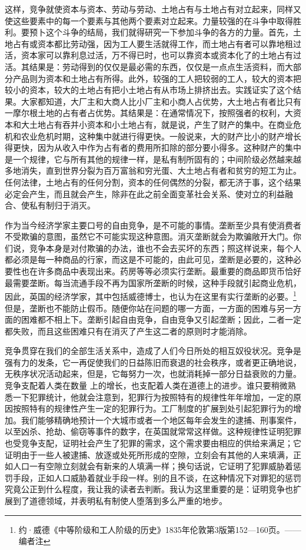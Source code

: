 \documentclass[a4paper,twoside,12pt]{ctexart}
\begin{document}
这样，竞争就使资本与资本、劳动与劳动、土地占有与土地占有对立起来，同样又使这些要素中的每一个要素与其他两个要素对立起来。力量较强的在斗争中取得胜利。要预卜这个斗争的结局，我们就得研究一下参加斗争的各方的力量。首先，土地占有或资本都比劳动强，因为工人要生活就得工作，而土地占有者可以靠地租过活，资本家可以靠利息过活，万不得已时，也可以靠资本或资本化了的土地占有过活。其结果是：劳动得到的仅仅是最必需的东西，仅仅是一点点生活资料，而大部分产品则为资本和土地占有所得。此外，较强的工人把较弱的工人，较大的资本把较小的资本，较大的土地占有把小土地占有从市场上排挤出去。实践证实了这个结果。大家都知道，大厂主和大商人比小厂主和小商人占优势，大土地占有者比只有一摩尔根土地的占有者占优势。其结果是：在通常情况下，按照强者的权利，大资本和大土地占有吞并小资本和小土地占有，就是说，产生了财产的集中。在商业危机和农业危机时期，这种集中就进行得更快。一般说来，大的财产比小的财产增长得更快，因为从收入中作为占有者的费用所扣除的部分要小得多。这种财产的集中是一个规律，它与所有其他的规律一样，是私有制所固有的；中间阶级必然越来越多地消失，直到世界分裂为百万富翁和穷光蛋、大土地占有者和贫穷的短工为止。任何法律，土地占有的任何分割，资本的任何偶然的分裂，都无济于事，这个结果必定会产生，而且就会产生，除非在此之前全面变革社会关系、使对立的利益融合、使私有制归于消灭。

作为当今经济学家主要口号的自由竞争，是不可能的事情。垄断至少具有使消费者不受欺骗的意图，虽然它不可能实现这种意图。消灭垄断就会为欺骗敞开大门。你们说，竞争本身是对付欺骗的办法，谁也不会去买坏的东西；照这样说来，每个人都必须是每一种商品的行家，而这是不可能的，由此可见，垄断是必要的，这种必要性也在许多商品中表现出来。药房等等必须实行垄断。最重要的商品即货币恰好最需要垄断。每当流通手段不再为国家所垄断的时候，这种手段就引起商业危机，因此，英国的经济学家，其中包括威德博士，也认为在这里有实行垄断的必要。\footnote{约·威德《中等阶级和工人阶级的历史》1835年伦敦第3版第152—160页。——编者注 }但是，垄断也不能防止假币。随便你站在问题的哪一方面，一方面的困难与另一方面的困难都不相上下。垄断引起自由竞争，自由竞争又引起垄断；因此，二者一定都失败，而且这些困难只有在消灭了产生这二者的原则时才能消除。

竞争贯穿在我们的全部生活关系中，造成了人们今日所处的相互奴役状况。竞争是强有力的发条，它一再促使我们的日益陈旧而衰退的社会秩序，或者更正确地说，无秩序状况活动起来，但是，它每努力一次，也就消耗掉一部分日益衰败的力量。竞争支配着人类在数量 上的增长，也支配着人类在道德上的进步。谁只要稍微熟悉一下犯罪统计，他就会注意到，犯罪行为按照特有的规律性年年增加，一定的原因按照特有的规律性产生一定的犯罪行为。工厂制度的扩展到处引起犯罪行为的增加。我们能够精确地预计一个大城市或者一个地区每年会发生的逮捕、刑事案件，以至凶杀、抢劫、偷窃等事件的数字，在英国就常常这样做。这种规律性证明犯罪也受竞争支配，证明社会产生了犯罪的需求，这个需求要由相应的供给来满足；它证明由于一些人被逮捕、放逐或处死所形成的空隙，立刻会有其他的人来填满，正如人口一有空隙立刻就会有新来的人填满一样；换句话说，它证明了犯罪威胁着惩罚手段，正如人口威胁着就业手段一样。别的且不谈，在这种情况下对罪犯的惩罚究竟公正到什么程度，我让我的读者去判断。我认为这里重要的是：证明竞争也扩展到了道德领域，并表明私有制使人堕落到多么严重的地步。
\end{document}
